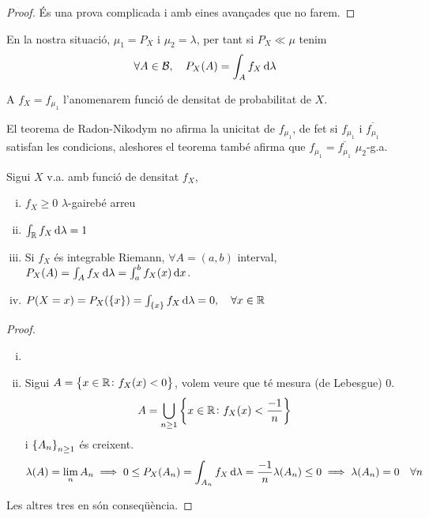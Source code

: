 \begin{proof}
    És una prova complicada i amb eines avançades que no farem.
\end{proof}

\begin{col}
    En la nostra situació, $\mu_1 = P_X$ i $\mu_2 = \lambda$, per tant si $P_X \ll \mu$ tenim
    \[\forall A \in\B,\quad P_X(A) = \int_A f_{X}\dif\lambda\] %
\end{col}

\begin{defi}
    A $f_X = f_{\mu_1}$ l'anomenarem funció de densitat de probabilitat de $X$.
\end{defi}

\begin{obs}
    El teorema de Radon-Nikodym no afirma la unicitat de $f_{\mu_1}$, de fet si $f_{\mu_1}$ i $\overline{f_{\mu_1}}$ satisfan les
    condicions, aleshores el teorema també afirma que $f_{\mu_1} = \overline{f_{\mu_1}}$ $\mu_2$-g.a.
\end{obs}

\begin{prop}
    Sigui $X$ v.a. amb funció de densitat $f_X$,
    \begin{enumerate}[i)]
        \item $f_X \ge 0$ $\lambda$-gairebé arreu
        \item $\int_\real f_X \dif\lambda = 1$
        \item Si $f_X$ és integrable Riemann, $\forall A = (a,b)$ interval, $P_X(A) = \int_A f_X\dif\lambda = \int_a^b f_X(x)\dif x$.
        \item $P(X=x) = P_X(\{x\}) = \int_{\{x\}} f_X \dif\lambda = 0, \quad\forall x\in\real$
    \end{enumerate}
\end{prop}

\begin{proof}
    \begin{enumerate}[i)]
        \item{}
        \item Sigui $A = \left\{ x\in\mathbb{R} \colon f_X(x)<0 \right\}$, volem veure que té mesura (de Lebesgue) 0.
            \[A = \bigcup_{n \ge 1} \left\{ x\in\mathbb{R} \colon f_X(x)<\frac{-1}{n} \right\}\]
            i $\left\{ A_n \right\}_{n \ge 1}$ és creixent.
            \[\lambda(A) = \lim_{n}A_n \implies 0 \le P_X(A_n) = \int_{A_n} f_X \dif\lambda = \frac{-1}{n}\lambda(A_n) \le 0 \implies \lambda(A_n)=0 \quad\forall n\]
    \end{enumerate}
    Les altres tres en són conseqüència.
\end{proof}



















